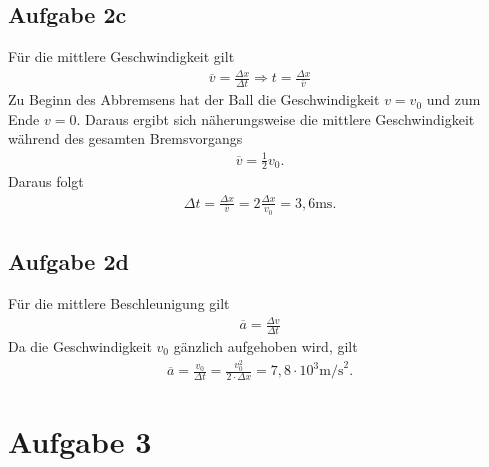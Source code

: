 \documentclass[a4paper,11pt]{article}
\begin{document}
\subsection*{Aufgabe 2c}
Für die mittlere Geschwindigkeit gilt
\begin{align*}
  \overline{v} = \frac{\Delta x}{\Delta t} \Rightarrow t = \frac{\Delta x}{\overline{v}}
\end{align*}
Zu Beginn des Abbremsens hat der Ball die Geschwindigkeit $v = v_0$ und zum Ende $v = 0$. Daraus ergibt sich näherungsweise die mittlere Geschwindigkeit während des gesamten Bremsvorgangs
\begin{align*}
  \overline{v} = \frac{1}{2} v_0 \mbox{.}
\end{align*}
Daraus folgt
\begin{align*}
  \Delta t = \frac{\Delta x}{\overline{v}} = 2\frac{\Delta x}{v_0} = 3,6 \mbox{ms.}
\end{align*}

\subsection*{Aufgabe 2d}
Für die mittlere Beschleunigung gilt
\begin{align*}
  \overline{a} = \frac{\Delta v}{\Delta t}
\end{align*}
Da die Geschwindigkeit $v_0$ gänzlich aufgehoben wird, gilt
\begin{align*}
  \overline{a} = \frac{v_0}{\Delta t} = \frac{v_0^2}{2\cdot\Delta x} = 7,8\cdot 10^3 \mbox{m/s}^2\mbox{.}
\end{align*}


\section*{Aufgabe 3}
\end{document}
